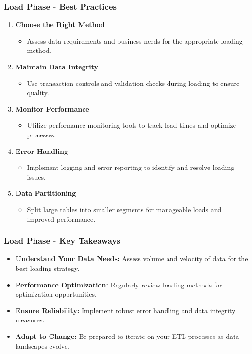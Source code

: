 \documentclass[aspectratio=169]{beamer}
\begin{document}
\begin{frame}[fragile]
    \frametitle{Load Phase - Best Practices}
    \begin{enumerate}
        \item \textbf{Choose the Right Method}
        \begin{itemize}
            \item Assess data requirements and business needs for the appropriate loading method.
        \end{itemize}
        
        \item \textbf{Maintain Data Integrity}
        \begin{itemize}
            \item Use transaction controls and validation checks during loading to ensure quality.
        \end{itemize}
        
        \item \textbf{Monitor Performance}
        \begin{itemize}
            \item Utilize performance monitoring tools to track load times and optimize processes.
        \end{itemize}

        \item \textbf{Error Handling}
        \begin{itemize}
            \item Implement logging and error reporting to identify and resolve loading issues.
        \end{itemize}

        \item \textbf{Data Partitioning}
        \begin{itemize}
            \item Split large tables into smaller segments for manageable loads and improved performance.
        \end{itemize}
    \end{enumerate}
\end{frame}

\begin{frame}[fragile]
    \frametitle{Load Phase - Key Takeaways}
    \begin{itemize}
        \item \textbf{Understand Your Data Needs:} Assess volume and velocity of data for the best loading strategy.
        \item \textbf{Performance Optimization:} Regularly review loading methods for optimization opportunities.
        \item \textbf{Ensure Reliability:} Implement robust error handling and data integrity measures.
        \item \textbf{Adapt to Change:} Be prepared to iterate on your ETL processes as data landscapes evolve.
    \end{itemize}
\end{frame}
\end{document}

